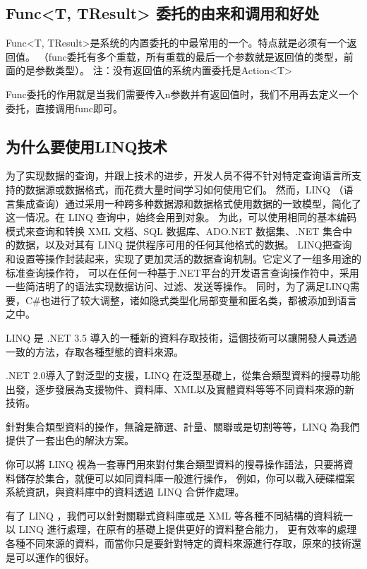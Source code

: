 \documentclass{book}
\begin{document}
\subsection{Func<T, TResult> 委托的由来和调用和好处}

Func<T, TResult>是系统的内置委托的中最常用的一个。特点就是必须有一个返回值。
（func委托有多个重载，所有重载的最后一个参数就是返回值的类型，前面的是参数类型）。
注：没有返回值的系统内置委托是Action<T>

Func委托的作用就是当我们需要传入n参数并有返回值时，我们不用再去定义一个委托，直接调用func即可。

\subsection{为什么要使用LINQ技术}

为了实现数据的查询，并跟上技术的进步，开发人员不得不针对特定查询语言所支持的数据源或数据格式，而花费大量时间学习如何使用它们。
然而，LINQ （语言集成查询）通过采用一种跨多种数据源和数据格式使用数据的一致模型，简化了这一情况。在 LINQ 查询中，始终会用到对象。
为此，可以使用相同的基本编码模式来查询和转换 XML 文档、SQL 数据库、ADO.NET 数据集、.NET 集合中的数据，以及对其有 LINQ 提供程序可用的任何其他格式的数据。
LINQ把查询和设置等操作封装起来，实现了更加灵活的数据查询机制。它定义了一组多用途的标准查询操作符，
可以在任何一种基于.NET平台的开发语言查询操作符中，采用一些简洁明了的语法实现数据访问、过滤、发送等操作。
同时，为了满足LINQ需要，C\#也进行了较大调整，诸如隐式类型化局部变量和匿名类，都被添加到语言之中。

LINQ 是 .NET 3.5 導入的一種新的資料存取技術，這個技術可以讓開發人員透過一致的方法，存取各種型態的資料來源。

.NET 2.0導入了對泛型的支援，LINQ 在泛型基礎上，從集合類型資料的搜尋功能出發，逐步發展為支援物件、資料庫、XML以及實體資料等等不同資料來源的新技術。

針對集合類型資料的操作，無論是篩選、計量、關聯或是切割等等，LINQ 為我們提供了一套出色的解決方案。

你可以將 LINQ 視為一套專門用來對付集合類型資料的搜尋操作語法，只要將資料儲存於集合，就便可以如同資料庫一般進行操作，
例如，你可以載入硬碟檔案系統資訊，與資料庫中的資料透過 LINQ 合併作處理。

有了 LINQ ，我們可以針對關聯式資料庫或是 XML 等各種不同結構的資料統一以 LINQ 進行處理，在原有的基礎上提供更好的資料整合能力，
更有效率的處理各種不同來源的資料，而當你只是要針對特定的資料來源進行存取，原來的技術還是可以運作的很好。
\end{document}
